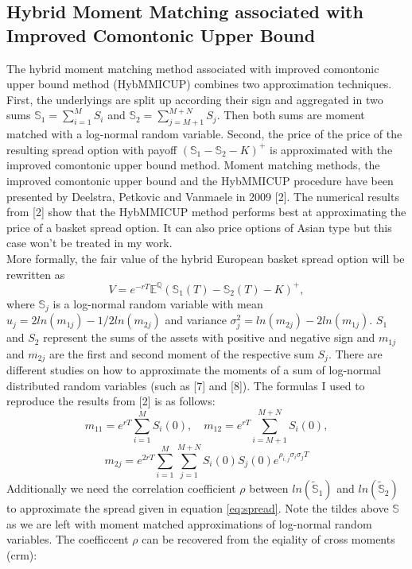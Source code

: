 \documentclass[a4paper]{article}
\begin{document}
\subsection{Hybrid Moment Matching associated with Improved Comontonic Upper Bound}
\label{sec:hybmmicup}
The hybrid moment matching method associated with improved comontonic upper bound method (HybMMICUP) combines two approximation techniques. First, the underlyings are split up according their sign and aggregated in two sums 
$\mathbb{S}_1=\sum_{i=1}^MS_i$ and $\mathbb{S}_2=\sum_{j=M+1}^{M+N}S_j.$ Then both sums are moment matched with a log-normal random variable. Second, the price of the price of the resulting spread option with payoff $(\mathbb{S}_1-\mathbb{S}_2-K)^+$ is approximated with the improved comontonic upper bound method. Moment matching methods, the improved comontonic upper bound and the HybMMICUP procedure have been presented by Deelstra, Petkovic and Vanmaele in 2009 [2]. The numerical results from [2] show that the HybMMICUP method  performs best at approximating the price of a basket spread option. It can also price options of Asian type but this case won’t be treated in my work.\\
More formally, the fair value of the hybrid European basket spread option will be rewritten as
\begin{equation}
\label{eq:spread}
V = e^{-rT}\mathbb{E}^\mathbb{Q}(\mathbb{S}_1(T) - \mathbb{S}_2(T) - K)^+, 
\end{equation} 
where $\mathbb{S}_j$ is a log-normal random variable with mean $u_j = 2ln(m_{1j}) - 1/2ln(m_{2j})$ and variance $\sigma_j^2 = ln(m_{2j})-2ln(m_{1j}).$
$S_1$ and $S_2$ represent the sums of the assets with positive and negative sign and $m_{1j}$ and $m_{2j}$ are the first and second moment of the respective sum $S_j$. There are different studies on how to approximate the moments of a sum of log-normal distributed random variables (such as [7] and [8]). The formulas I used to reproduce the results from [2] is as follows:
\begin{equation}
m_{11}=e^{rT}\sum_{i=1}^{M}S_i(0), \quad m_{12}=e^{rT}\sum_{i=M+1}^{M+N}S_i(0), 
\end{equation}
\begin{equation}
m_{2j}=e^{2rT}\sum_{i=1}^{M}\sum_{j=1}^{M+N}S_i(0)S_j(0)e^{\rho_{i,j}\sigma_i\sigma_jT}
\end{equation}
Additionally we need the correlation coefficient $\rho$ between $ln(\mathbb{\tilde{S}}_1)$ and $ln(\mathbb{\tilde{S}}_2)$ to approximate the spread given in equation \ref{eq:spread}. Note the tildes above $\mathbb{S}$ as we are left with moment matched approximations of log-normal random variables. The coefficcent $\rho$ can be recovered from the eqiality of cross moments (crm):
\end{document}
